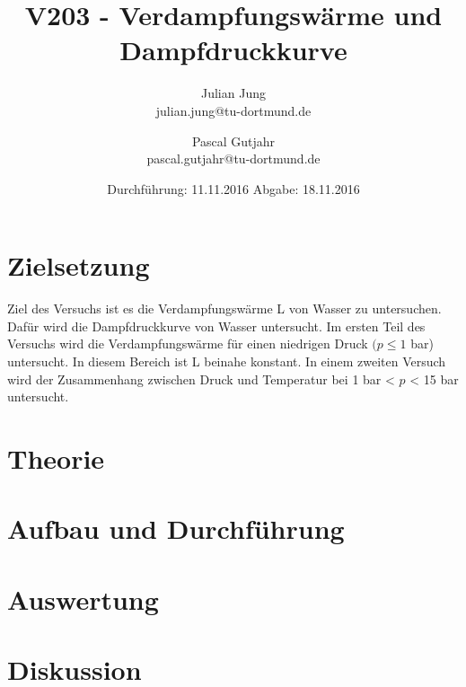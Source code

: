 

\title{V203 - Verdampfungswärme und Dampfdruckkurve}
\author{Julian Jung \\ julian.jung@tu-dortmund.de
  \and Pascal Gutjahr \\ pascal.gutjahr@tu-dortmund.de}
  \date{Durchführung: 11.11.2016
  \hspace{3em}
  Abgabe: 18.11.2016}
  
\maketitle
\newpage
\tableofcontents
\newpage
\section{Zielsetzung}
Ziel des Versuchs ist es die Verdampfungswärme L von Wasser zu untersuchen.
Dafür wird die Dampfdruckkurve von Wasser untersucht. Im ersten Teil des Versuchs
wird die Verdampfungswärme für einen niedrigen Druck $(p\le 1$ bar) untersucht. In
diesem Bereich ist L beinahe konstant. In einem zweiten Versuch wird der Zusammenhang
zwischen Druck und Temperatur bei 1 bar < $p$ < 15 bar untersucht.
\section{Theorie}

\section{Aufbau und Durchführung}

\section{Auswertung}

\section{Diskussion}

\printbibliography

